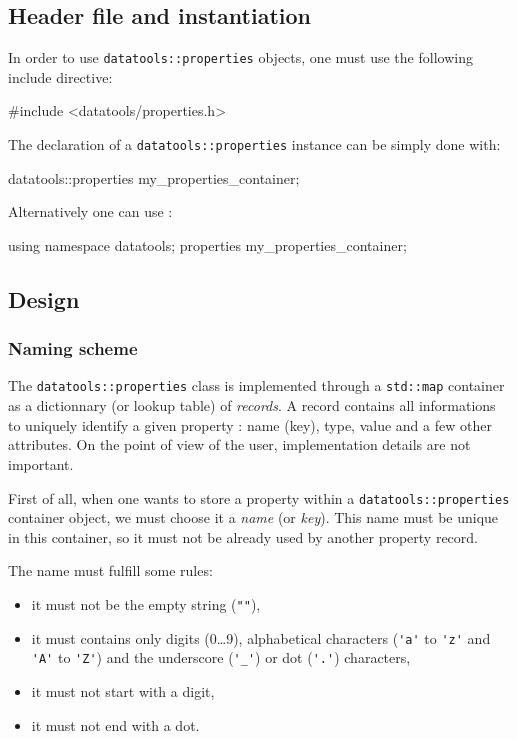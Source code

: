 \subsection{Header file and instantiation}

\pn In order to use \texttt{datatools::properties} objects, one
must use the following include directive:
\begin{CppVerbatim}
#include <datatools/properties.h>
\end{CppVerbatim}

\pn The declaration of a  \texttt{datatools::properties} instance
can be simply done with:
\begin{CppVerbatim}
datatools::properties my_properties_container;
\end{CppVerbatim}
Alternatively one can use :
\begin{CppVerbatim}
using namespace datatools;
properties my_properties_container;
\end{CppVerbatim}

\subsection{Design}

\subsubsection{Naming scheme}

The \texttt{datatools::properties} class is implemented through
a \texttt{std::map}  container as a  dictionnary (or lookup  table) of
\emph{records}.  A  record   contains  all  informations  to  uniquely
identify  a  given  property :  name (key),  type,  value  and a  few  other
attributes. On the  point of view of the  user, implementation details
are not important.

First  of  all,   when  one  wants  to  store   a  property  within  a
\texttt{datatools::properties} container object, we must choose
it  a \emph{name}  (or \emph{key}).  This name  must be  unique  in this
container, so it must not be already used by another property record.

The name must fulfill some rules:
\begin{itemize}

\item it must not be the empty string (\verb+""+),

\item it must contains  only digits (0\dots9), alphabetical characters
  (\verb+'a'+  to \verb+'z'+  and  \verb+'A'+ to  \verb+'Z'+) and  the
  underscore (\verb+'_'+) or dot (\verb+'.'+) characters,

\item it must not start with a digit,

\item it must not end with a dot.

\end{itemize}

